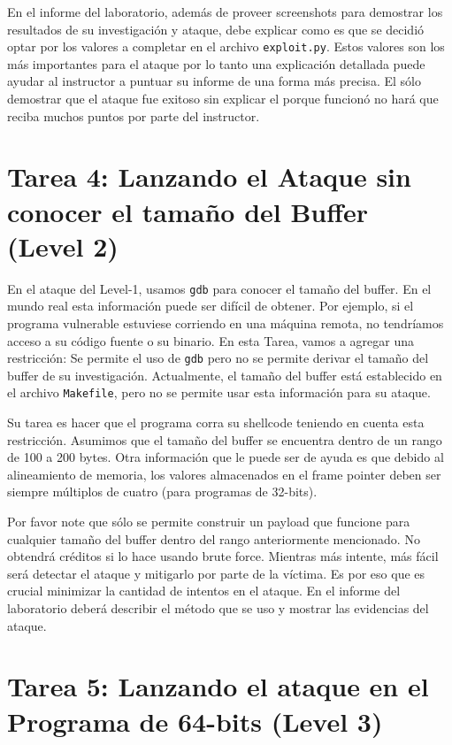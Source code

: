 En el informe del laboratorio, además de proveer screenshots para demostrar los resultados de su investigación y ataque, debe explicar como es que se decidió optar por los valores a completar en el archivo \texttt{exploit.py}. Estos valores son los más importantes para el ataque por lo tanto una explicación detallada puede ayudar al instructor a puntuar su informe de una forma más precisa. El sólo demostrar que el ataque fue exitoso sin explicar el porque funcionó no hará que reciba muchos puntos por parte del instructor.


\section{Tarea 4: Lanzando el Ataque sin conocer el tamaño del Buffer (Level 2)}

En el ataque del Level-1, usamos \texttt{gdb} para conocer el tamaño del buffer. En el mundo real esta información puede ser difícil de obtener. Por ejemplo, si el programa vulnerable estuviese corriendo en una máquina remota, no tendríamos acceso a su código fuente o su binario. En esta Tarea, vamos a agregar una restricción: Se permite el uso de \texttt{gdb} pero no se permite derivar el tamaño del buffer de su investigación. Actualmente, el tamaño del buffer está establecido en el archivo \texttt{Makefile}, pero no se permite usar esta información para su ataque.

Su tarea es hacer que el programa corra su shellcode teniendo en cuenta esta restricción. Asumimos que el tamaño del buffer se encuentra dentro de un rango de 100 a 200 bytes. Otra información que le puede ser de ayuda es que debido al alineamiento de memoria, los valores almacenados en el frame pointer deben ser siempre múltiplos de cuatro (para programas de 32-bits).

Por favor note que sólo se permite construir un payload que funcione para cualquier tamaño del buffer dentro del rango anteriormente mencionado. No obtendrá créditos si lo hace usando brute force. Mientras más intente, más fácil será detectar el ataque y mitigarlo por parte de la víctima. Es por eso que es crucial minimizar la cantidad de intentos en el ataque.
En el informe del laboratorio deberá describir el método que se uso y mostrar las evidencias del ataque.


\section{Tarea 5: Lanzando el ataque en el Programa de 64-bits (Level 3)}

